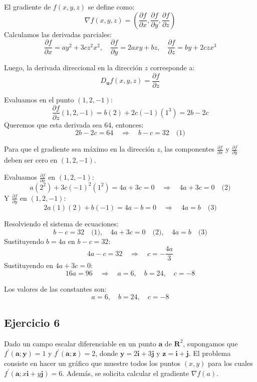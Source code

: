 \documentclass{report}
\begin{document}
    El gradiente de \(f(x,y,z)\) se define como:
    \[
    \nabla f(x, y, z) = \left( \frac{\partial f}{\partial x}, \frac{\partial f}{\partial y}, \frac{\partial f}{\partial z} \right)
    \]
    Calculamos las derivadas parciales:
    \[
    \frac{\partial f}{\partial x} = a y^2 + 3c z^2 x^2, \quad \frac{\partial f}{\partial y} = 2a x y + b z, \quad \frac{\partial f}{\partial z} = b y + 2c z x^3
    \]

    Luego, la derivada direccional en la dirección \(z\) corresponde a:
    \[
    D_{\mathbf{u}} f(x, y, z) = \frac{\partial f}{\partial z}
    \]

    Evaluamos en el punto \( (1, 2, -1) \):
    \[
    \frac{\partial f}{\partial z}(1, 2, -1) = b(2) + 2c(-1)(1^3) = 2b - 2c
    \]
    Queremos que esta derivada sea 64, entonces:
    \[
    2b - 2c = 64 \quad \Rightarrow \quad b - c = 32 \quad \text{(1)}
    \]

    Para que el gradiente sea máximo en la dirección \(z\), las componentes \( \frac{\partial f}{\partial x} \) y \( \frac{\partial f}{\partial y} \) deben ser cero en \( (1, 2, -1) \).

    Evaluamos \( \frac{\partial f}{\partial x} \) en \( (1, 2, -1) \):
    \[
    a(2^2) + 3c(-1)^2(1^2) = 4a + 3c = 0 \quad \Rightarrow \quad 4a + 3c = 0 \quad \text{(2)}
    \]
    Y \( \frac{\partial f}{\partial y} \) en \( (1, 2, -1) \):
    \[
    2a(1)(2) + b(-1) = 4a - b = 0 \quad \Rightarrow \quad 4a = b \quad \text{(3)}
    \]

    Resolviendo el sistema de ecuaciones:
    \[
    b - c = 32 \quad \text{(1)}, \quad 4a + 3c = 0 \quad \text{(2)}, \quad 4a = b \quad \text{(3)}
    \]
    Sustituyendo \( b = 4a \) en \( b - c = 32 \):
    \[
    4a - c = 32 \quad \Rightarrow \quad c = -\frac{4a}{3}
    \]
    Sustituyendo en \(4a + 3c = 0\):
    \[
    16a = 96 \quad \Rightarrow \quad a = 6, \quad b = 24, \quad c = -8
    \]

    Los valores de las constantes son:
    \[
    a = 6, \quad b = 24, \quad c = -8
    \]

    \newpage\subsection*{Ejercicio 6}
    Dado un campo escalar diferenciable en un punto $\boldsymbol{a}$ de $\mathbf{R}^{2}$, supongamos que $f^{\prime}(\boldsymbol{a} ; \boldsymbol{y})=1$ y $f^{\prime}(\boldsymbol{a} ; \boldsymbol{z})=2$, donde $\boldsymbol{y} = 2 \boldsymbol{i} + 3 \boldsymbol{j}$ y $\boldsymbol{z} = \boldsymbol{i} + \boldsymbol{j}$. El problema consiste en hacer un gráfico que muestre todos los puntos $(x, y)$ para los cuales $f^{\prime}(\boldsymbol{a}; x \boldsymbol{i} + y \boldsymbol{j}) = 6$. Además, se solicita calcular el gradiente $\nabla f(a)$.
\end{document}

